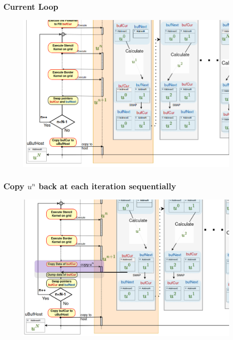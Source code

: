 \documentclass[9pt]{beamer}
\begin{document}
\begin{frame}
\frametitle{Current Loop}
\begin{figure}
    \centering
    \includegraphics[width=0.8\linewidth]{Screenshot from 2024-09-26 14-33-46.png}
\end{figure}
\end{frame}

\begin{frame}
\frametitle{Copy $u^{n}$ back at each iteration sequentially}
\begin{figure}
    \centering
    \includegraphics[width=0.8\linewidth]{Screenshot from 2024-09-26 15-05-08.png}
    \label{fig:enter-label}
\end{figure}
\end{frame}
\end{document}
